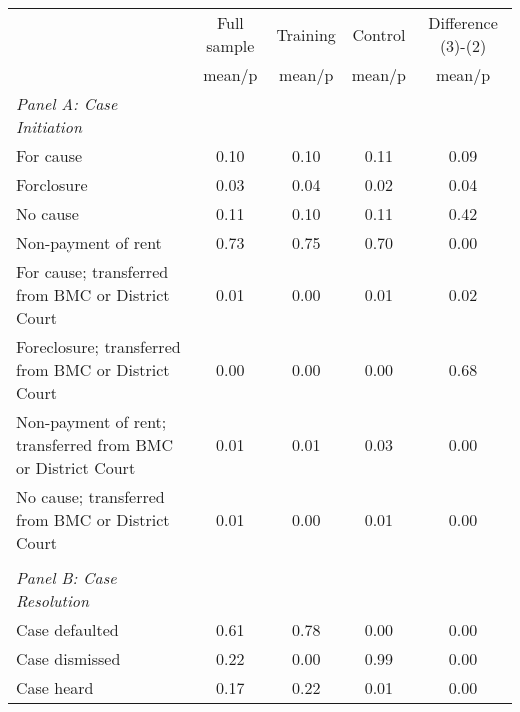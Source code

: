 {
\def\sym#1{\ifmmode^{#1}\else\(^{#1}\)\fi}
\begin{tabular}{l*{4}{c}}
\toprule
                    &\multicolumn{1}{c}{Full sample}&\multicolumn{1}{c}{Training}&\multicolumn{1}{c}{Control}&\multicolumn{1}{c}{Difference (3)-(2)}\\
                    &      mean/p&      mean/p&      mean/p&      mean/p\\
\midrule
\emph{Panel A: Case Initiation}&            &            &            &            \\
\hspace{0.25cm}For cause&       0.10 &       0.10 &       0.11 &        0.09\\
\hspace{0.25cm}Forclosure&       0.03 &       0.04 &       0.02 &        0.04\\
\hspace{0.25cm}No cause&       0.11 &       0.10 &       0.11 &        0.42\\
\hspace{0.25cm}Non-payment of rent&       0.73 &       0.75 &       0.70 &        0.00\\
\hspace{0.25cm}For cause; transferred from BMC or District Court&       0.01 &       0.00 &       0.01 &        0.02\\
\hspace{0.25cm}Foreclosure; transferred from BMC or District Court&       0.00 &       0.00 &       0.00 &        0.68\\
\hspace{0.25cm}Non-payment of rent; transferred from BMC or District Court&       0.01 &       0.01 &       0.03 &        0.00\\
\hspace{0.25cm}No cause; transferred from BMC or District Court&       0.01 &       0.00 &       0.01 &        0.00\\
\vspace{0.1em} \\ \emph{Panel B: Case Resolution}&            &            &            &            \\
\hspace{0.25cm}Case defaulted&       0.61 &       0.78 &       0.00 &        0.00\\
\hspace{0.25cm}Case dismissed&       0.22 &       0.00 &       0.99 &        0.00\\
\hspace{0.25cm}Case heard&       0.17 &       0.22 &       0.01 &        0.00\\

\end{tabular}}
